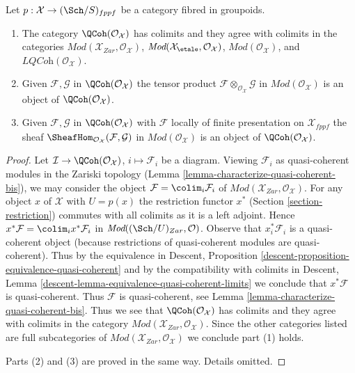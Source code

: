 \begin{lemma}
\label{lemma-qc-colimits}
Let $p : \mathcal{X} \to (\Sch/S)_{fppf}$ be a category
fibred in groupoids.
\begin{enumerate}
\item The category $\QCoh(\mathcal{O}_\mathcal{X})$
has colimits and they agree with colimits in the categories
$\textit{Mod}(\mathcal{X}_{Zar}, \mathcal{O}_\mathcal{X})$,
$\textit{Mod}(\mathcal{X}_\etale, \mathcal{O}_\mathcal{X})$,
$\textit{Mod}(\mathcal{O}_\mathcal{X})$, and
$\textit{LQCoh}(\mathcal{O}_\mathcal{X})$.
\item Given $\mathcal{F}, \mathcal{G}$ in
$\QCoh(\mathcal{O}_\mathcal{X})$
the tensor product $\mathcal{F} \otimes_{\mathcal{O}_\mathcal{X}} \mathcal{G}$
in $\textit{Mod}(\mathcal{O}_\mathcal{X})$
is an object of $\QCoh(\mathcal{O}_\mathcal{X})$.
\item Given $\mathcal{F}, \mathcal{G}$ in
$\QCoh(\mathcal{O}_\mathcal{X})$
with $\mathcal{F}$ locally of finite presentation on
$\mathcal{X}_{fppf}$ the sheaf
$\SheafHom_{\mathcal{O}_\mathcal{X}}(\mathcal{F}, \mathcal{G})$
in $\textit{Mod}(\mathcal{O}_\mathcal{X})$
is an object of $\QCoh(\mathcal{O}_\mathcal{X})$.
\end{enumerate}
\end{lemma}

\begin{proof}
Let $\mathcal{I} \to \QCoh(\mathcal{O}_\mathcal{X})$,
$i \mapsto \mathcal{F}_i$ be a diagram.
Viewing $\mathcal{F}_i$ as quasi-coherent modules
in the Zariski topology (Lemma \ref{lemma-characterize-quasi-coherent-bis}), we
may consider the object $\mathcal{F} = \colim_i \mathcal{F}_i$ of
$\textit{Mod}(\mathcal{X}_{Zar}, \mathcal{O}_\mathcal{X})$.
For any object $x$ of $\mathcal{X}$ with $U = p(x)$ the restriction functor
$x^*$ (Section \ref{section-restriction})
commutes with all colimits as it is a left adjoint. Hence
$x^*\mathcal{F} = \colim_i x^*\mathcal{F}_i$ in
$\textit{Mod}((\Sch/U)_{Zar}, \mathcal{O})$.
Observe that $x_i^*\mathcal{F}_i$ is a quasi-coherent object
(because restrictions of quasi-coherent modules are quasi-coherent).
Thus by the equivalence in
Descent, Proposition \ref{descent-proposition-equivalence-quasi-coherent}
and by the compatibility with colimits in
Descent, Lemma \ref{descent-lemma-equivalence-quasi-coherent-limits}
we conclude that $x^*\mathcal{F}$ is quasi-coherent.
Thus $\mathcal{F}$ is quasi-coherent, see
Lemma \ref{lemma-characterize-quasi-coherent-bis}.
Thus we see that $\QCoh(\mathcal{O}_\mathcal{X})$
has colimits and they agree with colimits in the category
$\textit{Mod}(\mathcal{X}_{Zar}, \mathcal{O}_\mathcal{X})$.
Since the other categories listed are full subcategories
of $\textit{Mod}(\mathcal{X}_{Zar}, \mathcal{O}_\mathcal{X})$
we conclude part (1) holds.

\medskip\noindent
Parts (2) and (3) are proved in the same way.
Details omitted.
\end{proof}






